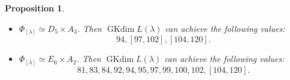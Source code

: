 \documentclass[reqno,12pt]{amsart}
\numberwithin{equation}{section}
\theoremstyle{plain}
\newtheorem{Prop}[Thm]{Proposition}
\theoremstyle{definition}
\newtheorem{Rem}[Thm]{Remark}
\newcommand{\lam}{\lambda}
\newcommand{\ep}{\varepsilon}
\newcommand{\gkd}{\operatorname{GKdim}}
\begin{document}
\begin{Prop}
\begin{itemize}
\item[(7)] $\Phi_{[\lam]}\simeq D_5\times A_3$. Then 
 $ \gkd L(\lam) $ can achieve the following values:
 $$94,[97,102],[104,120].$$









\item[(8)] $\Phi_{[\lam]}\simeq E_6\times A_2$. Then 
 $ \gkd L(\lam) $ can achieve the following values:
$$81,83,84,92,94,95,97,99,100,102,[104,120].$$






\end{itemize}
\end{Prop}





      
\end{document}
